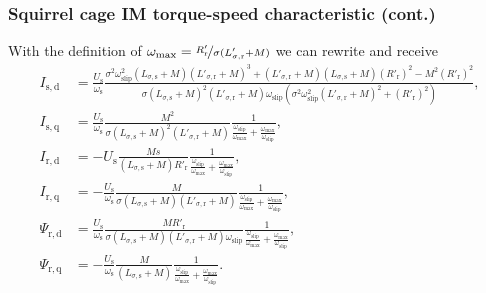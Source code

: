 \begin{frame}
	\frametitle{Squirrel cage IM torque-speed characteristic (cont.)} 
    With the definition of $\omega_\mathrm{max}=\nicefrac{R'_\mathrm{r}}{\sigma (L'_{\sigma,\mathrm{r}} +M)}$ we can rewrite and receive \pause
    \small
    \begin{align}
        I_\mathrm{s,d} &= \frac{U_\mathrm{s}}{\omega_\mathrm{s}}\frac{\sigma^2 \omega^2_\mathrm{slip} (L_{\sigma,\mathrm{s}} +M)(L'_{\sigma,\mathrm{r}} +M)^3 + (L'_{\sigma,\mathrm{r}} +M)(L_{\sigma,\mathrm{s}} +M)(R'_\mathrm{r})^2 - M^2(R'_\mathrm{r})^2}{\sigma (L_{\sigma,\mathrm{s}} +M)^2(L'_{\sigma,\mathrm{r}} +M) \omega_\mathrm{slip}(\sigma^2 \omega^2_\mathrm{slip}(L'_{\sigma,\mathrm{r}} +M)^2 + (R'_\mathrm{r})^2)},\\
        I_\mathrm{s,q} &= \frac{U_\mathrm{s}}{\omega_\mathrm{s}}\frac{M^2}{\sigma (L_{\sigma,\mathrm{s}} +M)^2(L'_{\sigma,\mathrm{r}} +M)}\frac{1}{\frac{\omega_\mathrm{slip}}{\omega_\mathrm{max}} + \frac{\omega_\mathrm{max}}{\omega_\mathrm{slip}}},\\
        I_\mathrm{r,d} &= -U_\mathrm{s}\frac{M s}{(L_{\sigma,\mathrm{s}} +M)R'_\mathrm{r}}\frac{1}{\frac{\omega_\mathrm{slip}}{\omega_\mathrm{max}} + \frac{\omega_\mathrm{max}}{\omega_\mathrm{slip}}},\\
        I_\mathrm{r,q} &= -\frac{U_\mathrm{s}}{\omega_\mathrm{s}} \frac{M}{\sigma (L_{\sigma,\mathrm{s}} +M)(L'_{\sigma,\mathrm{r}} +M)}\frac{1}{\frac{\omega_\mathrm{slip}}{\omega_\mathrm{max}} + \frac{\omega_\mathrm{max}}{\omega_\mathrm{slip}}},\\
        \Psi_\mathrm{r,d} &= \frac{U_\mathrm{s}}{\omega_\mathrm{s}}\frac{M R'_\mathrm{r}}{\sigma (L_{\sigma,\mathrm{s}} +M) (L'_{\sigma,\mathrm{r}} +M)\omega_\mathrm{slip}}\frac{1}{\frac{\omega_\mathrm{slip}}{\omega_\mathrm{max}} + \frac{\omega_\mathrm{max}}{\omega_\mathrm{slip}}},\\
        \Psi_\mathrm{r,q} &= -\frac{U_\mathrm{s}}{\omega_\mathrm{s}}\frac{M}{(L_{\sigma,\mathrm{s}} +M)}\frac{1}{\frac{\omega_\mathrm{slip}}{\omega_\mathrm{max}} + \frac{\omega_\mathrm{max}}{\omega_\mathrm{slip}}}.
    \end{align}
    \normalsize 
\end{frame}

